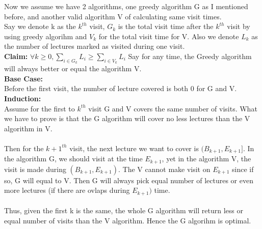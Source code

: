 \documentclass{article}
\begin{document}
\begin{enumerate}
\begin{itemize}
                Now we assume we have 2 algorithms, one greedy algorithm G as I mentioned before, and another valid algorithm V of calculating same visit times. \\
                Say we denote k as the $k^{th}$ visit, $G_k$ is the total visit time after the $k^{th}$ visit by using greedy algorihm and $V_k$ for the total visit time for V. Also we denote $L_k$ as the number of lectures marked as visited during one visit. \\
                \textbf{Claim: } $\forall k \geq 0 , \sum _ { i \in G _ { k } } L _ { i } \geq \sum _ { i \in V _ { k } } L_ { i }$
                Say for any time, the Greedy algorithm will always better or equal the algorithm V. \\
                \textbf{Base Case:} \\
                Before the first visit, the number of lecture covered is both 0 for G and V. \\
                \textbf{Induction:} \\   
                Assume for the first to $k^{th}$ visit G and V covers the same number of visits. What we have to prove is that the G algorithm will cover no less lectures than the V algorithm in V. \\
                \\
                Then for the $k+1^{th}$ visit, the next lecture we want to cover is $(B_{k+1}, E_{k+1}]$. In the algorithm G, we should visit at the time $E_{k+1}$, yet in the algorithm V, the visit is made during $(B_{k+1}, E_{k+1})$. The V cannot make visit on $E_{k+1}$ since if so, G will equal to V. Then G will always pick equal number of lectures or even more lectures (if there are ovlaps during $E_{k+1})$ time. \\
                \\
                Thus, given the first k is the same, the whole G algorithm will return less or equal number of visits than the V algorithm. Hence the G algorihm is optimal.
            \end{itemize}

    \end{enumerate}
    
\end{document}
